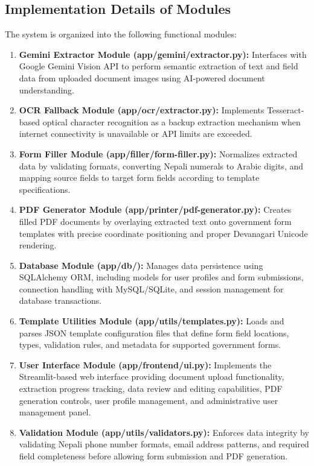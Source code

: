 \documentclass[12pt]{report}
\begin{document}
\subsection{Implementation Details of Modules}
The system is organized into the following functional modules:
\begin{enumerate}[label=\textbullet, leftmargin=*, nosep, itemsep=2pt, topsep=2pt]

\item \textbf{Gemini Extractor Module (app/gemini/extractor.py):}
Interfaces with Google Gemini Vision API to perform semantic extraction of text and field data from uploaded document images using AI-powered document understanding.

\item \textbf{OCR Fallback Module (app/ocr/extractor.py):}
Implements Tesseract-based optical character recognition as a backup extraction mechanism when internet connectivity is unavailable or API limits are exceeded.

\item \textbf{Form Filler Module (app/filler/form-filler.py):}
Normalizes extracted data by validating formats, converting Nepali numerals to Arabic digits, and mapping source fields to target form fields according to template specifications.

\item \textbf{PDF Generator Module (app/printer/pdf-generator.py):}
Creates filled PDF documents by overlaying extracted text onto government form templates with precise coordinate positioning and proper Devanagari Unicode rendering.

\item \textbf{Database Module (app/db/):}
Manages data persistence using SQLAlchemy ORM, including models for user profiles and form submissions, connection handling with MySQL/SQLite, and session management for database transactions.

\item \textbf{Template Utilities Module (app/utils/templates.py):}
Loads and parses JSON template configuration files that define form field locations, types, validation rules, and metadata for supported government forms.

\item \textbf{User Interface Module (app/frontend/ui.py):}
Implements the Streamlit-based web interface providing document upload functionality, extraction progress tracking, data review and editing capabilities, PDF generation controls, user profile management, and administrative user management panel.

\item \textbf{Validation Module (app/utils/validators.py):}
Enforces data integrity by validating Nepali phone number formats, email address patterns, and required field completeness before allowing form submission and PDF generation.

\end{enumerate}
\end{document}
